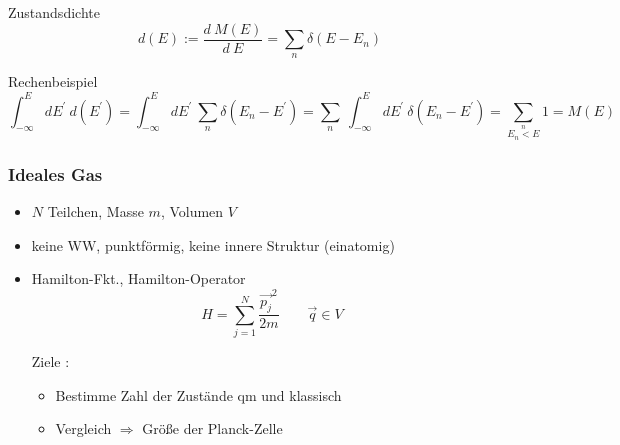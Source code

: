 \begin{definition}{Zustandsdichte}
    \begin{equation}
        d(E):= \frac{d \ M(E)}{d \ E} = \sum_n \delta(E-E_n)
    \end{equation}
\end{definition}

\begin{beispiel}{Rechenbeispiel}
    \begin{equation}
        \int_{-\infty}^E dE^\prime \ d(E^\prime) = \int_{-\infty}^E dE^\prime \ \sum_n \delta(E_n -E^\prime)= \sum_n\ \int_{-\infty}^E dE^\prime \ \delta(E_n -E^\prime) = \sum_{\overset{n}{E_n<E}} 1 = M(E)
    \end{equation}
\end{beispiel}

\subsubsection{Ideales Gas}\label{seq.ideales Gas}
\begin{itemize}
    \item $N$ Teilchen, Masse $m$, Volumen $V$
    \item keine WW, punktförmig, keine innere Struktur (einatomig)
    \item Hamilton-Fkt., Hamilton-Operator
    \begin{equation}
        H = \sum_{j=1}^N \frac{\Vec{p_j}^2}{2m} \qquad \Vec{q} \in V
    \end{equation}
    \item[Ziele]:
    \begin{itemize}
        \item Bestimme Zahl der Zustände qm und klassisch
        \item Vergleich $\Rightarrow$ Größe der Planck-Zelle
    \end{itemize}
\end{itemize}

